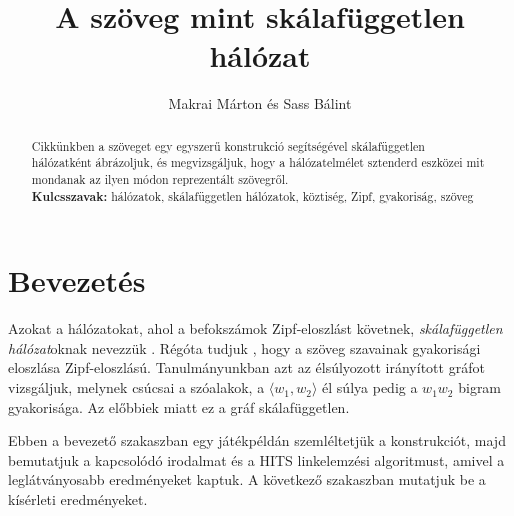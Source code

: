 \documentclass{llncs}
\begin{document}


\title{A szöveg mint skálafüggetlen hálózat}
\author{Makrai Márton és Sass Bálint\\
}
\maketitle


\begin{abstract}
Cikkünkben a szöveget egy egyszerű konstrukció segítségével
skálafüggetlen hálózatként ábrázoljuk,
és megvizsgáljuk, hogy a hálózatelmélet sztenderd eszközei
mit mondanak az ilyen módon reprezentált szövegről.
\\{\bf Kulcsszavak:} hálózatok, skálafüggetlen hálózatok, köztiség, Zipf, gyakoriság, szöveg
\end{abstract}


\section{Bevezetés}
\label{sec:otlet}

Azokat a hálózatokat, ahol a befokszámok
Zipf-eloszlást követnek, \emph{skálafüggetlen hálózat}oknak nevezzük
\cite{barabasi1999emergence}
\cite[703.\ oldal]{kovacs2012magyar}.
%
Régóta tudjuk \cite{Zipf:1935}, hogy a szöveg szavainak gyakorisági eloszlása
Zipf-eloszlású.
%
Tanulmányunkban azt az élsúlyozott irányított gráfot vizsgáljuk, melynek
csúcsai a szóalakok, a $\langle w_1, w_2\rangle$ él súlya pedig a $w_1w_2$
bigram gyakorisága. Az előbbiek miatt ez a gráf skálafüggetlen.

Ebben a bevezető szakaszban
egy játékpéldán szemléltetjük a konstrukciót,
majd bemutatjuk a kapcsolódó irodalmat
és a HITS linkelemzési algoritmust,
amivel a leglátványosabb eredményeket kaptuk.
A következő szakaszban mutatjuk be a kísérleti eredményeket.
\end{document}

